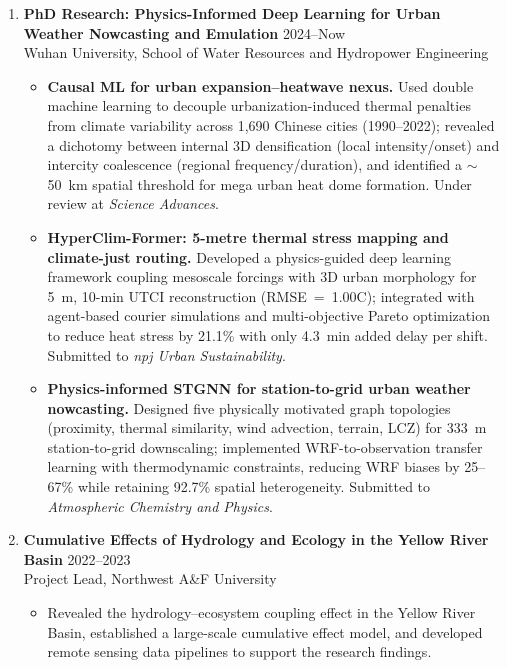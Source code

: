 \documentclass[10pt,a4paper]{article}
\begin{document}
\begin{enumerate}[leftmargin=22pt]
    \item \textbf{PhD Research: Physics-Informed Deep Learning for Urban Weather Nowcasting and Emulation} \hfill 2024--Now\\
    Wuhan University, School of Water Resources and Hydropower Engineering
    \begin{itemize}
        \item \textbf{Causal ML for urban expansion--heatwave nexus.} Used double machine learning to decouple urbanization-induced thermal penalties from climate variability across 1,690 Chinese cities (1990--2022); revealed a dichotomy between internal 3D densification (local intensity/onset) and intercity coalescence (regional frequency/duration), and identified a $\sim$50~km spatial threshold for mega urban heat dome formation. Under review at \textit{Science Advances}.

        \item \textbf{HyperClim-Former: 5-metre thermal stress mapping and climate-just routing.} Developed a physics-guided deep learning framework coupling mesoscale forcings with 3D urban morphology for 5~m, 10-min UTCI reconstruction (RMSE~=~1.00\textdegree C); integrated with agent-based courier simulations and multi-objective Pareto optimization to reduce heat stress by 21.1\% with only 4.3~min added delay per shift. Submitted to \textit{npj Urban Sustainability}.

        \item \textbf{Physics-informed STGNN for station-to-grid urban weather nowcasting.} Designed five physically motivated graph topologies (proximity, thermal similarity, wind advection, terrain, LCZ) for 333~m station-to-grid downscaling; implemented WRF-to-observation transfer learning with thermodynamic constraints, reducing WRF biases by 25--67\% while retaining 92.7\% spatial heterogeneity. Submitted to \textit{Atmospheric Chemistry and Physics}.
    \end{itemize}

    \item \textbf{Cumulative Effects of Hydrology and Ecology in the Yellow River Basin} \hfill 2022--2023\\
    Project Lead, Northwest A\&F University
    \begin{itemize}
        \item Revealed the hydrology--ecosystem coupling effect in the Yellow River Basin, established a large-scale cumulative effect model, and developed remote sensing data pipelines to support the research findings.
    \end{itemize}


\end{enumerate}
\end{document}
